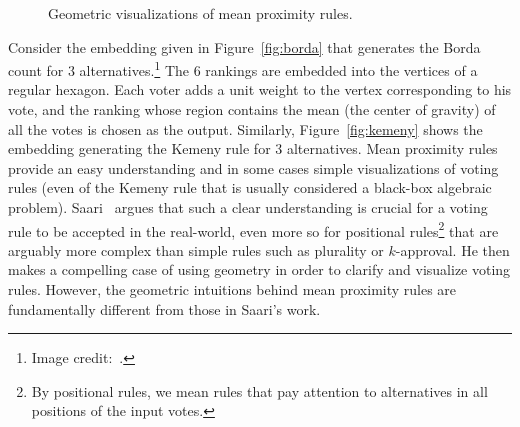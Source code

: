 \documentclass[prodmode]{acmsmall-ec14}
\begin{document}
{%
\begin{figure}
\centering
{}\qquad
{}
\caption{Geometric visualizations of mean proximity rules.}
\label{fig:geometric}
\end{figure}
}

Consider the embedding given in Figure~\ref{fig:borda} that generates the Borda count for $3$ alternatives.\footnote{Image credit:~\cite{ovchinnikov2005hyperplane}.} The $6$ rankings are embedded into the vertices of a regular hexagon. Each voter adds a unit weight to the vertex corresponding to his vote, and the ranking whose region contains the mean (the center of gravity) of all the votes is chosen as the output.
Similarly, Figure~\ref{fig:kemeny} shows the embedding generating the Kemeny rule for $3$ alternatives. Mean proximity rules provide an easy understanding and in some cases simple visualizations of voting rules (even of the Kemeny rule that is usually considered a black-box algebraic problem). Saari~ argues that such a clear understanding is crucial for a voting rule to be accepted in the real-world, even more so for positional rules\footnote{By positional rules, we mean rules that pay attention to alternatives in all positions of the input votes.} that are arguably more complex than simple rules such as plurality or $k$-approval. He then makes a compelling case of using geometry in order to clarify and visualize voting rules. However, the geometric intuitions behind mean proximity rules are fundamentally different from those in Saari's work. 
\end{document}
